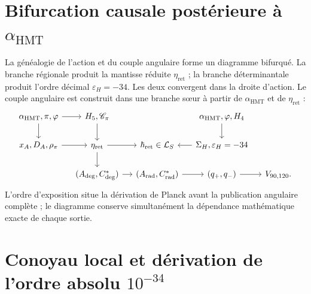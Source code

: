 \section{Bifurcation causale postérieure à \texorpdfstring{\(\alpha_{\mathrm{HMT}}\)}{alpha HMT}}
\label{sec:l9s102:bifurcacion-accion-angular}

La généalogie de l'action et du couple angulaire forme un diagramme bifurqué.
La branche régionale produit la mantisse réduite \(\eta_{\mathrm{ret}}\) ; la branche
déterminantale produit l'ordre décimal \(\varepsilon_H=-34\). Les deux
convergent dans la droite d'action. Le couple angulaire est construit dans une branche
sœur à partir de \(\alpha_{\mathrm{HMT}}\) et de
\(\eta_{\mathrm{ret}}\) :
\begin{equation}
\begin{tikzcd}[column sep=small,row sep=normal]
\alpha_{\mathrm{HMT}},\pi,\varphi
  \arrow[r] \arrow[d]
& H_5,\mathscr C_\pi
  \arrow[d]
&& \alpha_{\mathrm{HMT}},\varphi,H_4
  \arrow[d] & {}\\
x_A,D_A,\rho_\pi
  \arrow[r]
& \eta_{\mathrm{ret}}
  \arrow[r] \arrow[d]
& \hbar_{\mathrm{ret}}\in\mathcal L_S
& \Sigma_H,\varepsilon_H=-34
  \arrow[l] & {}\\
& (A_{\deg},C^*_{\deg})
  \arrow[r]
& (A_{\mathrm{rad}},C^*_{\mathrm{rad}})
  \arrow[r]
& (q_+,q_-)
  \arrow[r]
& V_{90,120}.
\end{tikzcd}
\label{diag:l9s102:dag-accion-angular}
\end{equation}
L'ordre d'exposition situe la dérivation de Planck avant la publication
angulaire complète ; le diagramme conserve simultanément la dépendance
mathématique exacte de chaque sortie.

\section{Conoyau local et dérivation de l'ordre absolu \texorpdfstring{\(10^{-34}\)}{10^-34}}
\label{sec:l9s102:orden-accion}

